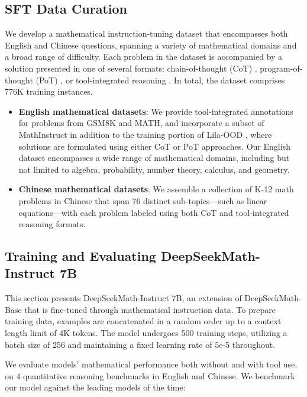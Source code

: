 \begin{itemize}[topsep=0pt]
\subsection{SFT Data Curation}

We develop a mathematical instruction-tuning dataset that encompasses both English and Chinese questions, spanning a variety of mathematical domains and a broad range of difficulty. Each problem in the dataset is accompanied by a solution presented in one of several formats: chain-of-thought (CoT) \citep{cot}, program-of-thought (PoT) \citep{pot,pal}, or tool-integrated reasoning \citep{tora}. In total, the dataset comprises 776K training instances.

\begin{itemize}[topsep=0pt]
    \item \textbf{English mathematical datasets}: We provide tool-integrated annotations for problems from GSM8K and MATH, and incorporate a subset of MathInstruct \citep{MathInstruct} in addition to the training portion of Lila-OOD \citep{lila}, where solutions are formulated using either CoT or PoT approaches. Our English dataset encompasses a wide range of mathematical domains, including but not limited to algebra, probability, number theory, calculus, and geometry.
    \item \textbf{Chinese mathematical datasets}: We assemble a collection of K-12 math problems in Chinese that span 76 distinct sub-topics—such as linear equations—with each problem labeled using both CoT and tool-integrated reasoning formats.
\end{itemize}

\subsection{Training and Evaluating DeepSeekMath-Instruct 7B}

This section presents DeepSeekMath-Instruct 7B, an extension of DeepSeekMath-Base that is fine-tuned through mathematical instruction data. To prepare training data, examples are concatenated in a random order up to a context length limit of 4K tokens. The model undergoes 500 training steps, utilizing a batch size of 256 and maintaining a fixed learning rate of 5e-5 throughout.

We evaluate models' mathematical performance both without and with tool use, on 4 quantitative reasoning benchmarks in English and Chinese. We benchmark our model against the leading models of the time:


\end{itemize}
